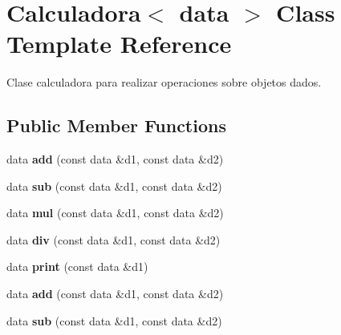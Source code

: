 \hypertarget{classCalculadora}{\section{Calculadora$<$ data $>$ Class Template Reference}
\label{classCalculadora}
}


Clase calculadora para realizar operaciones sobre objetos dados.  


\subsection*{Public Member Functions}
\begin{DoxyCompactItemize}
\item 
\hypertarget{classCalculadora_a00da139b55a89c626e2271ba09036976}{data {\bfseries add} (const data \&d1, const data \&d2)}\label{classCalculadora_a00da139b55a89c626e2271ba09036976}

\item 
\hypertarget{classCalculadora_a62c4343b62257ffc4b2e6c4f3178df81}{data {\bfseries sub} (const data \&d1, const data \&d2)}\label{classCalculadora_a62c4343b62257ffc4b2e6c4f3178df81}

\item 
\hypertarget{classCalculadora_a8405bf64afad4435c29975ce6bc74189}{data {\bfseries mul} (const data \&d1, const data \&d2)}\label{classCalculadora_a8405bf64afad4435c29975ce6bc74189}

\item 
\hypertarget{classCalculadora_ae8e459b7a229cbeeb72ff783c2928caa}{data {\bfseries div} (const data \&d1, const data \&d2)}\label{classCalculadora_ae8e459b7a229cbeeb72ff783c2928caa}

\item 
\hypertarget{classCalculadora_a05ea419a0e82aa47a0450ae05717f9e5}{data {\bfseries print} (const data \&d1)}\label{classCalculadora_a05ea419a0e82aa47a0450ae05717f9e5}

\item 
\hypertarget{classCalculadora_a00da139b55a89c626e2271ba09036976}{data {\bfseries add} (const data \&d1, const data \&d2)}\label{classCalculadora_a00da139b55a89c626e2271ba09036976}

\item 
\hypertarget{classCalculadora_a62c4343b62257ffc4b2e6c4f3178df81}{data {\bfseries sub} (const data \&d1, const data \&d2)}\label{classCalculadora_a62c4343b62257ffc4b2e6c4f3178df81}


\end{DoxyCompactItemize}

